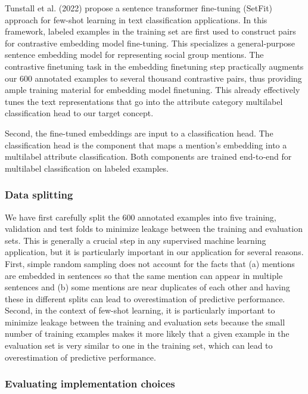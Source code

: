 \documentclass[12pt]{article}
\begin{document}
Tunstall et al. (2022) propose a sentence transformer fine-tuning (SetFit) approach for few-shot learning in text classification applications.
In this framework, labeled examples in the training set are first used to construct pairs for contrastive embedding model fine-tuning.
This specializes a general-purpose sentence embedding model for representing social group mentions.
The contrastive finetuning task in the embedding finetuning step practically augments our 600 annotated examples to several thousand contrastive pairs, thus providing ample training material for embedding model finetuning.
This already effectively tunes the text representations that go into the attribute category multilabel classification head to our target concept.

Second, the fine-tuned embeddings are input to a classification head.
The classification head is the component that maps a mention's embedding into a multilabel attribute classification.
Both components are trained end-to-end for multilabel classification on labeled examples.

\subsubsection{Data splitting}\label{data-splitting}

We have first carefully split the 600 annotated examples into five training, validation and test folds to minimize leakage between the training and evaluation sets.
This is generally a crucial step in any supervised machine learning application, but it is particularly important in our application for several reasons.
First, simple random sampling does not account for the facts that
(a) mentions are embedded in sentences so that the same mention can appear in multiple sentences and
(b) some mentions are near duplicates of each other and having these in different splits can lead to overestimation of predictive performance.
Second, in the context of few-shot learning, it is particularly important to minimize leakage between the training and evaluation sets because the small number of training examples makes it more likely that a given example in the evaluation set is very similar to one in the training set, which can lead to overestimation of predictive performance.

\subsubsection{Evaluating implementation choices}\label{evaluating-implementation-choices}
\end{document}
